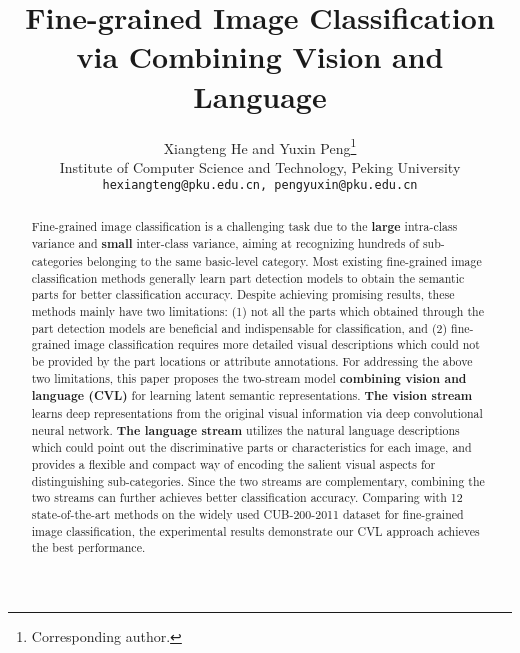 \documentclass[10pt,twocolumn,letterpaper]{article}
\begin{document}
\title{Fine-grained Image Classification via Combining Vision and Language}

\author{Xiangteng He and Yuxin Peng\thanks{Corresponding author.} \\
Institute of Computer Science and Technology, Peking University\\
{\tt\small hexiangteng@pku.edu.cn, pengyuxin@pku.edu.cn}
}

\maketitle
\thispagestyle{empty}

\begin{abstract}
Fine-grained image classification is a challenging task due to the \textbf{large} intra-class variance and \textbf{small} inter-class variance, aiming at recognizing hundreds of sub-categories belonging to the same basic-level category. Most existing fine-grained image classification methods generally learn part detection models to obtain the semantic parts for better classification accuracy. Despite achieving promising results, these methods mainly have two limitations: (1) not all the parts which obtained through the part detection models are beneficial and indispensable for classification, and (2) fine-grained image classification requires more detailed visual descriptions which could not be provided by the part locations or attribute annotations. For addressing the above two limitations, this paper proposes the two-stream model \textbf{combining vision and language (CVL)} for learning latent semantic representations. \textbf{The vision stream} learns deep representations from the original visual information via deep convolutional neural network. \textbf{The language stream} utilizes the natural language descriptions which could point out the discriminative parts or characteristics for each image, and provides a flexible and compact way of encoding the salient visual aspects for distinguishing sub-categories. Since the two streams are complementary, combining the two streams can further achieves better classification accuracy. Comparing with 12 state-of-the-art methods on the widely used CUB-200-2011 dataset for fine-grained image classification, the experimental results demonstrate our CVL approach achieves the best performance.
\end{abstract}
\end{document}
